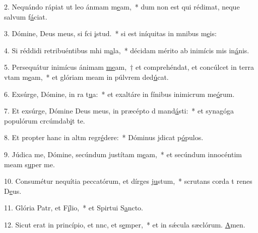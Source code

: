 2. Nequándo rápiat ut leo ánmam m\uline{e}am,~* dum non est qui rédimat, neque  salvum f\uline{á}ciat.\par 
3. Dómine, Deus meus, si fci \uline{i}stud.~* si est iníquitas in mnibus m\uline{e}is:\par 
4. Si réddidi retribuéntibus mhi m\uline{a}la,~* décidam mérito ab inimícis mis in\uline{á}nis.\par 
5. Persequátur inimícus ánimam \uline{me}am,~† et comprehéndat, et concúlcet in terra vtam m\uline{e}am,~* et glóriam meam in púlvrem ded\uline{ú}cat.\par 
6. Exsúrge, Dómine, in ra t\uline{u}a:~* et exaltáre in fínibus inimicrum me\uline{ó}rum.\par 
7. Et exsúrge, Dómine Deus meus, in præcépto d mand\uline{á}sti:~* et synagóga populórum crcúmdab\uline{i}t te.\par 
8. Et propter hanc in altm regr\uline{é}dere:~* Dóminus jdicat p\uline{ó}pulos.\par 
9. Júdica me, Dómine, secúndum justítam m\uline{e}am,~* et secúndum innocéntim meam s\uline{u}per me.\par 
10. Consumétur nequítia peccatórum, et dírges j\uline{u}stum,~* scrutans corda t renes D\uline{e}us.\par 
11. Glória Patr, et F\uline{í}lio,~* et Spirtui S\uline{a}ncto.\par 
12. Sicut erat in princípio, et nnc, et s\uline{e}mper,~* et in sǽcula sæclórum. \uline{A}men.\par 
